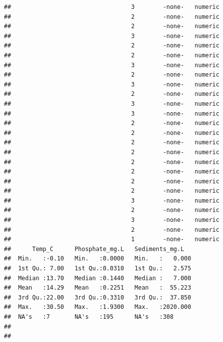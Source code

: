 \documentclass[
  12pt,
]{article}
\begin{document}
\begin{verbatim}
##                                  3        -none-   numeric                    
##                                  2        -none-   numeric                    
##                                  2        -none-   numeric                    
##                                  3        -none-   numeric                    
##                                  2        -none-   numeric                    
##                                  2        -none-   numeric                    
##                                  3        -none-   numeric                    
##                                  2        -none-   numeric                    
##                                  3        -none-   numeric                    
##                                  2        -none-   numeric                    
##                                  3        -none-   numeric                    
##                                  3        -none-   numeric                    
##                                  2        -none-   numeric                    
##                                  2        -none-   numeric                    
##                                  2        -none-   numeric                    
##                                  2        -none-   numeric                    
##                                  2        -none-   numeric                    
##                                  2        -none-   numeric                    
##                                  2        -none-   numeric                    
##                                  2        -none-   numeric                    
##                                  3        -none-   numeric                    
##                                  2        -none-   numeric                    
##                                  3        -none-   numeric                    
##                                  2        -none-   numeric                    
##                                  1        -none-   numeric                    
##      Temp_C      Phosphate_mg.L   Sediments_mg.L    
##  Min.   :-0.10   Min.   :0.0000   Min.   :   0.000  
##  1st Qu.: 7.00   1st Qu.:0.0310   1st Qu.:   2.575  
##  Median :13.70   Median :0.1440   Median :   7.000  
##  Mean   :14.29   Mean   :0.2251   Mean   :  55.223  
##  3rd Qu.:22.00   3rd Qu.:0.3310   3rd Qu.:  37.850  
##  Max.   :30.50   Max.   :1.9300   Max.   :2020.000  
##  NA's   :7       NA's   :195      NA's   :308       
##                                                     
##                                                     

\end{verbatim}
\end{document}
